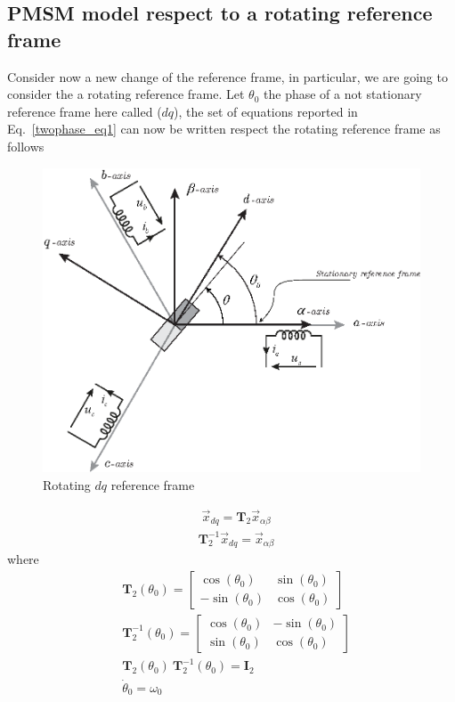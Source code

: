 \documentclass[11pt,a4paper,oneside]{book}
\numberwithin{equation}{section}
\theoremstyle{it}
\theoremstyle{definition}
\begin{document}
\subsection{PMSM model respect to a rotating reference frame}
Consider now a new change of the reference frame, in particular, we are going 
to consider the a rotating reference frame. Let $\theta_0$ the phase of a not 
stationary reference frame here called ($dq$), the set of equations reported in 
Eq.~\eqref{twophase_eq1} can now be written respect the rotating reference 
frame 
as follows
\begin{figure}[H]
	\centering
	\includegraphics[width = 320pt, 
	keepaspectratio]{figures/pmsm/reference_frames_dq.eps}
	\captionsetup{width=0.5\textwidth, font=small} \caption	{Rotating $dq$ reference frame}
	\label{dq_ref_frame}
\end{figure}
\begin{equation}
	\begin{aligned}\label{t2}
		& \vec{x}_{dq}=\mathbf{T}_2\vec{x}_{\alpha\beta}
	\end{aligned} 
\end{equation}
\begin{equation}\label{t2_1}
	\begin{aligned}
		& \mathbf{T}_2^{-1}\vec{x}_{dq}=\vec{x}_{\alpha\beta}
	\end{aligned} 
\end{equation}
where
\begin{equation}
	\begin{aligned}
		& \mathbf{T}_2(\theta_0) = 
		\begin{bmatrix}
			\cos(\theta_0) & \sin(\theta_0) \\[6pt]
			-\sin(\theta_0) & \cos(\theta_0) 
		\end{bmatrix} \\[6pt]
		& \mathbf{T}_2^{-1}(\theta_0) = 
		\begin{bmatrix}
			\cos(\theta_0) & -\sin(\theta_0) \\[6pt]
			\sin(\theta_0) & \cos(\theta_0) 
		\end{bmatrix}\\[6pt]
		& \mathbf{T}_2(\theta_0) \ \mathbf{T}_2^{-1}(\theta_0)= \mathbf{I}_2 
		\\[6pt]
		& \dot{\theta}_0=\omega_0
	\end{aligned} 
\end{equation}
\end{document}
